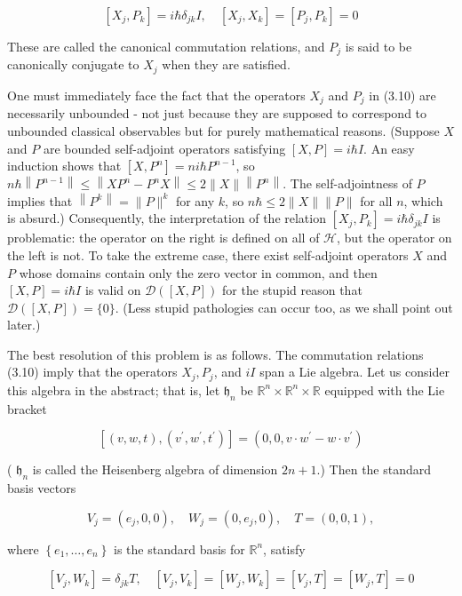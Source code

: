 \documentclass[10pt, letterpaper]{article}
\begin{document}
$$
\left[X_{j}, P_{k}\right]=i \hbar \delta_{j k} I, \quad\left[X_{j}, X_{k}\right]=\left[P_{j}, P_{k}\right]=0
$$

These are called the canonical commutation relations, and $P_{j}$ is said to be canonically conjugate to $X_{j}$ when they are satisfied.

One must immediately face the fact that the operators $X_{j}$ and $P_{j}$ in (3.10) are necessarily unbounded - not just because they are supposed to correspond to unbounded classical observables but for purely mathematical reasons. (Suppose $X$\\
and $P$ are bounded self-adjoint operators satisfying $[X, P]=i \hbar I$. An easy induction shows that $\left[X, P^{n}\right]=n i \hbar P^{n-1}$, so $n \hbar\left\|P^{n-1}\right\| \leq\left\|X P^{n}-P^{n} X\right\| \leq 2\|X\|\left\|P^{n}\right\|$. The self-adjointness of $P$ implies that $\left\|P^{k}\right\|=\|P\|^{k}$ for any $k$, so $n \hbar \leq 2\|X\|\|P\|$ for all $n$, which is absurd.) Consequently, the interpretation of the relation $\left[X_{j}, P_{k}\right]= i \hbar \delta_{j k} I$ is problematic: the operator on the right is defined on all of $\mathcal{H}$, but the operator on the left is not. To take the extreme case, there exist self-adjoint operators $X$ and $P$ whose domains contain only the zero vector in common, and then $[X, P]=i \hbar I$ is valid on $\mathcal{D}([X, P])$ for the stupid reason that $\mathcal{D}([X, P])=\{0\}$. (Less stupid pathologies can occur too, as we shall point out later.)

The best resolution of this problem is as follows. The commutation relations (3.10) imply that the operators $X_{j}, P_{j}$, and $i I$ span a Lie algebra. Let us consider this algebra in the abstract; that is, let $\mathfrak{h}_{n}$ be $\mathbb{R}^{n} \times \mathbb{R}^{n} \times \mathbb{R}$ equipped with the Lie bracket

$$
\left[(v, w, t),\left(v^{\prime}, w^{\prime}, t^{\prime}\right)\right]=\left(0,0, v \cdot w^{\prime}-w \cdot v^{\prime}\right)
$$

( $\mathfrak{h}_{n}$ is called the Heisenberg algebra of dimension $2 n+1$.) Then the standard basis vectors

$$
V_{j}=\left(e_{j}, 0,0\right), \quad W_{j}=\left(0, e_{j}, 0\right), \quad T=(0,0,1),
$$

where $\left\{e_{1}, \ldots, e_{n}\right\}$ is the standard basis for $\mathbb{R}^{n}$, satisfy

$$
\left[V_{j}, W_{k}\right]=\delta_{j k} T, \quad\left[V_{j}, V_{k}\right]=\left[W_{j}, W_{k}\right]=\left[V_{j}, T\right]=\left[W_{j}, T\right]=0
$$
\end{document}
